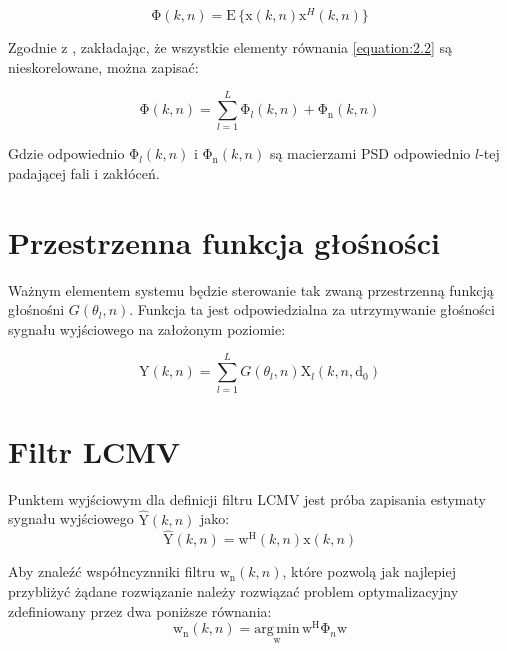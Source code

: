 \begin{equation}
    \label{equation:PSD matrix}
    \mathrm{\Phi}(k,n) = \mathrm{E} \, \{\bm{\mathrm{x}}(k,n) \bm{\mathrm{x}}^{H}(k,n)\}
\end{equation}

Zgodnie z \cite{Thiergart2013}, zakładając, że wszystkie elementy równania \ref{equation:2.2} są nieskorelowane, można zapisać:

\begin{equation}
    \label{equation:PSD signal noise}
    \bm{\mathrm{\Phi}}(k,n) = 
    \sum_{l=1}^{L} \bm{\mathrm{\Phi}}_{l}(k,n) +
    \bm{\mathrm{\Phi}}_{\mathrm{n}}(k,n)
\end{equation}

Gdzie odpowiednio $\bm{\mathrm{\Phi}}_{l}(k,n)$ i $\bm{\mathrm{\Phi}}_{\mathrm{n}}(k,n)$ są macierzami PSD odpowiednio $l$-tej padającej fali i zakłóceń.

\section{Przestrzenna funkcja głośności}

Ważnym elementem systemu będzie sterowanie tak zwaną przestrzenną funkcją głośnośni $G(\theta_{l},n)$. Funkcja ta jest odpowiedzialna za utrzymywanie głośności sygnału wyjściowego na założonym poziomie:

\begin{equation}
    \label{equation:G}
    \mathrm{Y}(k,n)= 
    \sum_{l=1}^{L} G(\theta_{l},n)
    \mathrm{X}_{l}(k,n,\bm{\mathrm{d}}_0)
\end{equation}

\section{Filtr LCMV}

Punktem wyjściowym dla definicji filtru LCMV jest próba zapisania estymaty sygnału wyjściowego $\hat{\mathrm{Y}}(k,n)$ jako:
\begin{equation}
    \label{equation:Y estimation}
    \hat{\mathrm{Y}}(k,n)=
    \bm{\mathrm{w}}^{\mathrm{H}}(k,n)
    \bm{\mathrm{x}}(k,n)
\end{equation}

\noindent Aby znaleźć współncyznniki filtru $\bm{\mathrm{w}}_{\mathrm{n}}(k,n)$, które pozwolą jak najlepiej przybliżyć żądane rozwiązanie należy rozwiązać problem optymalizacyjny zdefiniowany przez dwa poniższe równania:
\begin{equation}
    \label{equation:argmin}
    \bm{\mathrm{w}}_{\mathrm{n}}(k,n) = 
    \underset{\bm{\mathrm{w}}}{\mathrm{arg \, min}} \,
    \bm{\mathrm{w}}^{\mathrm{H}}
    \bm{\mathrm{\Phi}}_{n}
    \bm{\mathrm{w}}
\end{equation}


